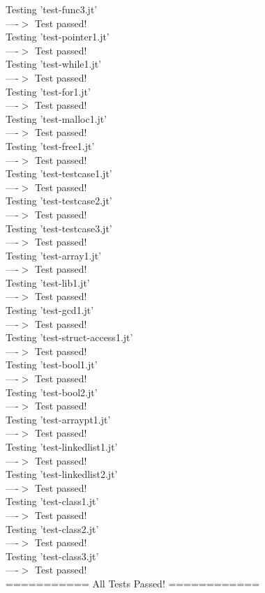 \documentclass{article}
\begin{document}
Testing 'test-func3.jt'\\
  ----$>$  Test passed!\\
Testing 'test-pointer1.jt'\\
  ----$>$  Test passed!\\
Testing 'test-while1.jt'\\
  ----$>$  Test passed!\\
Testing 'test-for1.jt'\\
  ----$>$  Test passed!\\
Testing 'test-malloc1.jt'\\
  ----$>$  Test passed!\\
Testing 'test-free1.jt'\\
  ----$>$  Test passed!\\
Testing 'test-testcase1.jt'\\
  ----$>$  Test passed!\\
Testing 'test-testcase2.jt'\\
  ----$>$  Test passed!\\
Testing 'test-testcase3.jt'\\
  ----$>$  Test passed!\\
Testing 'test-array1.jt'\\
  ----$>$  Test passed!\\
Testing 'test-lib1.jt'\\
  ----$>$  Test passed!\\
Testing 'test-gcd1.jt'\\
  ----$>$  Test passed!\\
Testing 'test-struct-access1.jt'\\
  ----$>$  Test passed!\\
Testing 'test-bool1.jt'\\
  ----$>$  Test passed!\\
Testing 'test-bool2.jt'\\
  ----$>$  Test passed!\\
Testing 'test-arraypt1.jt'\\
  ----$>$  Test passed!\\
  Testing 'test-linkedlist1.jt'\\
  ----$>$  Test passed!\\
Testing 'test-linkedlist2.jt'\\
  ----$>$  Test passed!\\
Testing 'test-class1.jt'\\
  ----$>$  Test passed!\\
Testing 'test-class2.jt'\\
  ----$>$  Test passed!\\
Testing 'test-class3.jt'\\
  ----$>$  Test passed!\\
=========== All Tests Passed! ============\\
\end{document}
